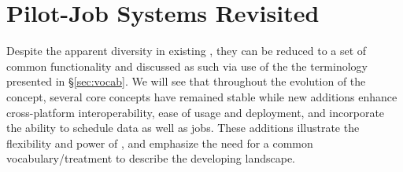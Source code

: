 \documentclass{sig-alternate}
\begin{document}



\section{Pilot-Job Systems Revisited}
Despite the apparent diversity in existing \pilotjobs,
they can be reduced to a set of common functionality and
discussed as such via use of the the terminology presented
in \S\ref{sec:vocab}.
We will see that throughout the evolution
of the \pilotjob concept, several core concepts have remained stable
while new additions enhance cross-platform interoperability,
ease of usage and deployment, and incorporate the ability to
schedule data as well as jobs.   These additions illustrate
the flexibility and power of \pilotjobs, and emphasize the
need for a common vocabulary/treatment to describe the
developing landscape.


\end{document}
